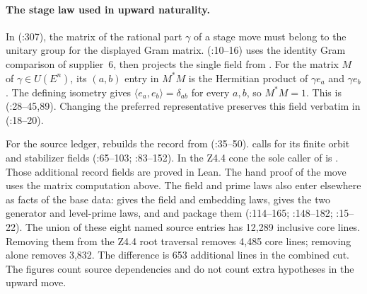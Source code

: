 \paragraph{The stage law used in upward naturality.}\label{r13:stage-unit}
In  (:307),
the matrix of the rational part $\gamma$ of a stage move must belong
to the unitary group for the displayed Gram matrix.
 (:10--16)
uses the identity Gram comparison of supplier~6, then projects the
single field  from .
For the matrix $M$ of $\gamma\in U(E^n)$, its $(a,b)$ entry in
$M^*M$ is the Hermitian product of $\gamma e_a$ and $\gamma e_b$.
The defining isometry gives $\langle e_a,e_b\rangle=\delta_{ab}$
for every $a,b$, so $M^*M=1$. This is 
(:28--45,89). Changing the
preferred representative preserves this field verbatim in
 (:18--20).

For the source ledger,  rebuilds the record
from 
(:35--50).
 calls  for its finite
orbit and stabilizer fields
(:65--103;
:83--152).
In the Z4.4 cone the sole caller of  is
. Those additional record fields are proved
in Lean. The hand proof of the move uses the matrix computation above.
The field and prime laws also enter elsewhere as facts of the base
data:  gives the field and embedding laws,
 gives the two generator and level-prime
laws, and  and  package them
(:114--165;
:148--182; :15--22).
The union of these eight named source entries has 12,289 inclusive
core lines. Removing them from the Z4.4 root traversal removes 4,485
core lines; removing  alone removes 3,832. The difference
is 653 additional lines in the combined cut. The figures count source
dependencies and do not count extra hypotheses in the upward move.

